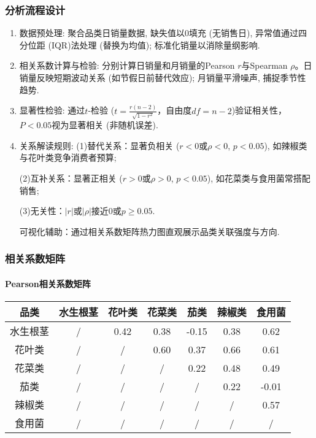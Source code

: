 \documentclass{cumcmthesis}
\begin{document}
\subsubsection{分析流程设计}
\begin{enumerate}
    \item 数据预处理: 聚合品类日销量数据, 缺失值以0填充 (无销售日), 异常值通过四分位距 (IQR)法处理 (替换为均值); 标准化销量以消除量纲影响. 
    \item 相关系数计算与检验: 分别计算日销量和月销量的Pearson $r$与Spearman $\rho$。日销量反映短期波动关系 (如节假日前替代效应); 月销量平滑噪声, 捕捉季节性趋势. 
    \item 显著性检验: 通过$t$-检验 ($t=\frac{r(n-2)}{\sqrt{1-r^2}}$，自由度$df=n-2$)验证相关性，$P<0.05$视为显著相关 (非随机误差). 
    \item 关系解读规则: 
    (1)替代关系：显著负相关 ($r<0$或$\rho<0$, $p<0.05$), 如辣椒类与花叶类竞争消费者预算; 

    (2)互补关系：显著正相关 ($r>0$或$\rho>0$, $p<0.05$), 如花菜类与食用菌常搭配销售;  

    (3)无关性：$|r|$或$|\rho|$接近0或$p≥0.05$.

    可视化辅助：通过相关系数矩阵热力图直观展示品类关联强度与方向. 
\end{enumerate}

\subsubsection{相关系数矩阵} 
\paragraph{Pearson相关系数矩阵}
\begin{table}[H]
\centering
\begin{tabular}{c c c c c c c}
\toprule
品类 & 水生根茎 & 花叶类 & 花菜类 & 茄类 & 辣椒类 & 食用菌 \\
\midrule
水生根茎 & / & 0.42 & 0.38 & -0.15 & 0.38 & 0.62 \\
花叶类 & / & / & 0.60 & 0.37 & 0.66 & 0.61 \\
花菜类 & / & / & / & 0.22 & 0.48 & 0.49 \\
茄类 & / & / & / & / & 0.22 & -0.01 \\
辣椒类 & / & / & / & / & / & 0.57 \\
食用菌 & / & / & / & / & / & / \\
\bottomrule
\end{tabular}
\end{table}
\end{document}
